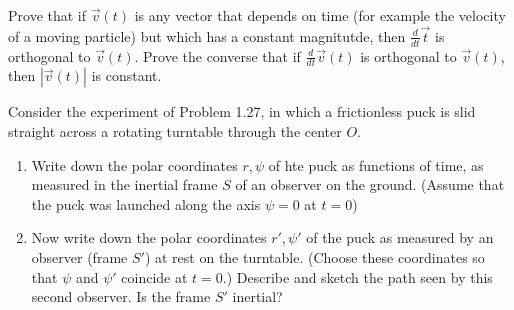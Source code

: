 \begin{tcolorbox}[title=Problem 45, breakable]
    Prove that if $\vec{v}(t)$ is any vector that depends 
    on time (for example the velocity of a moving particle)
    but which has a constant magnitutde, 
    then $\frac{d}{dt} \vec{t}$ is orthogonal to $\vec{v}(t)$.
    Prove the converse that if $\frac{d}{dt} \vec{v}(t)$
    is orthogonal to $\vec{v}(t)$, then $|\vec{v}(t)|$ is constant.
\end{tcolorbox}

\begin{tcolorbox}[title=Problem 46, breakable]
    Consider the experiment of Problem 1.27,
    in which a frictionless puck is slid straight 
    across a rotating turntable through the center $O$.
    \begin{enumerate}
        \item Write down the polar coordinates $r, \psi$ of hte puck 
        as functions of time, as measured in the inertial frame $S$ of an 
        observer on the ground. (Assume that the puck was launched 
        along the axis $\psi = 0$ at $t = 0$)
        \item Now write down the polar coordinates $r', \psi'$
        of the puck as measured by an observer (frame $S'$) at rest 
        on the turntable. (Choose these coordinates so that $\psi$ 
        and $\psi'$ coincide at $t = 0$.) Describe and sketch the path 
        seen by this second observer. Is the frame $S'$ inertial?
    \end{enumerate}
\end{tcolorbox}

